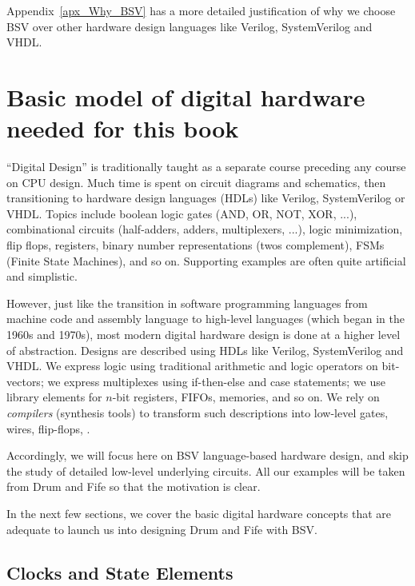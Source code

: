 Appendix~\ref{apx_Why_BSV} has a more detailed justification of why we
choose BSV over other hardware design languages like Verilog,
SystemVerilog and VHDL.


\section{Basic model of digital hardware needed for this book}

``Digital Design'' is traditionally taught as a separate course
preceding any course on CPU design.  Much time is spent on circuit
diagrams and schematics, then transitioning to hardware design
languages (HDLs) like Verilog, SystemVerilog or VHDL.  Topics include
boolean logic gates (AND, OR, NOT, XOR, ...), combinational circuits
(half-adders, adders, multiplexers, ...), logic minimization, flip
flops, registers, binary number representations (twos complement),
FSMs (Finite State Machines), and so on.  Supporting examples are
often quite artificial and simplistic.

However, just like the transition in software programming languages
from machine code and assembly language to high-level languages (which
began in the 1960s and 1970s), most modern digital hardware design is
done at a higher level of abstraction.  Designs are described using
HDLs like Verilog, SystemVerilog and VHDL.  We express logic using
traditional arithmetic and logic operators on bit-vectors; we express
multiplexes using if-then-else and case statements; we use library
elements for $n$-bit registers, FIFOs, memories, and so on.  We rely
on \emph{compilers} (synthesis tools) to transform such descriptions
into low-level gates, wires, flip-flops, {\etc}.

Accordingly, we will focus here on BSV language-based hardware design,
and skip the study of detailed low-level underlying circuits.  All our
examples will be taken from Drum and Fife so that the motivation is
clear.

In the next few sections, we cover the basic digital hardware concepts
that are adequate to launch us into designing Drum and Fife with BSV.


\subsection{Clocks and State Elements}

